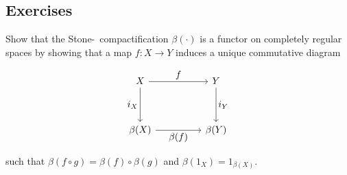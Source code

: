 \documentclass[letterpaper, 11pt, oneside]{book}
\begin{document}
\clearpage

\subsection*{Exercises}

\begin{exercise}
  Show that the Stone-\Cech\ compactification $\beta(\cdot)$ is a functor on completely regular spaces by showing that a map $f\colon X \to Y$ induces a unique commutative diagram
  \begin{figure}[h]
    \centering
    \[
      \begin{tikzcd}[every label/.append style={font=\normalsize}]
        X && Y \\
        \\
        {\beta(X)} && {\beta(Y)}
        \arrow["f", from=1-1, to=1-3]
        \arrow["{i_Y}", from=1-3, to=3-3]
        \arrow["{\beta(f)}"', from=3-1, to=3-3]
        \arrow["{i_X}"', from=1-1, to=3-1]
      \end{tikzcd}
    \]
    \addtocounter{figure}{1}
  \end{figure}
  such that $\beta(f \circ g) = \beta(f) \circ \beta(g)$ and $\beta(1_{X}) = 1_{\beta(X)}$.
\end{exercise}
\end{document}
